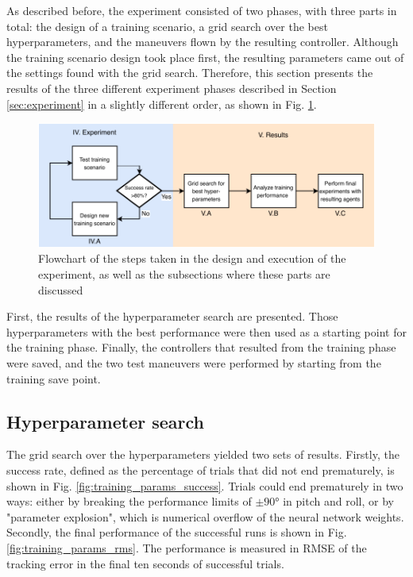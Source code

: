 As described before, the experiment consisted of two phases, with three parts in total: the design of a training scenario, a grid search over the best hyperparameters, and the maneuvers flown by the resulting controller. Although the training scenario design took place first, the resulting parameters came out of the settings found with the grid search. Therefore, this section presents the results of the three different experiment phases described in Section \ref{sec:experiment} in a slightly different order, as shown in Fig. \ref{fig:flowchart_results}. 

\begin{figure}
    \centering
    \includegraphics{fig/5/flowchart.pdf}
    \caption{Flowchart of the steps taken in the design and execution of the experiment, as well as the subsections where these parts are discussed }
    \label{fig:flowchart_results}
\end{figure}

First, the results of the hyperparameter search are presented. Those hyperparameters with the best performance were then used as a starting point for the training phase. Finally, the controllers that resulted from the training phase were saved, and the two test maneuvers were performed by starting from the training save point. 

\subsection{Hyperparameter search} \label{ssec:results:training}
The grid search over the hyperparameters yielded two sets of results. Firstly, the success rate, defined as the percentage of trials that did not end prematurely, is shown in Fig. \ref{fig:training_params_success}. Trials could end prematurely in two ways: either by breaking the performance limits of $\pm90\si{\degree}$ in pitch and roll, or by "parameter explosion", which is numerical overflow of the neural network weights. Secondly, the final performance of the successful runs is shown in Fig. \ref{fig:training_params_rms}. The performance is measured in RMSE of the tracking error in the final ten seconds of successful trials.

